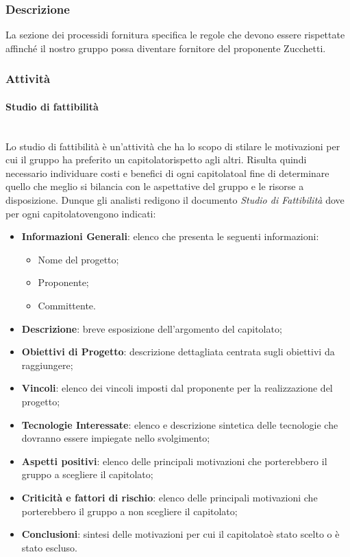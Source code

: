 \subsubsection{Descrizione}
La sezione dei processi\glosp di fornitura specifica le regole che devono essere rispettate affinché il nostro gruppo possa diventare fornitore del proponente Zucchetti.
\subsubsection{Attività}
\paragraph{Studio di fattibilità}\mbox{}\\ [1mm]
Lo studio di fattibilità è un'attività che ha lo scopo di stilare le motivazioni per cui il gruppo ha preferito un capitolato\glosp rispetto agli altri.
Risulta quindi necessario individuare costi e benefici di ogni capitolato\glosp al fine di determinare quello che meglio si bilancia con le aspettative del gruppo e le risorse a disposizione.
Dunque gli analisti redigono il documento \textit{Studio di Fattibilità} dove per ogni capitolato\glosp vengono indicati:
\begin{itemize}
	\item \textbf{Informazioni Generali}: elenco che presenta le seguenti informazioni: 
	\begin{itemize}
		\item Nome del progetto\glo;
		\item Proponente;
		\item Committente.
	\end{itemize} 
	\item \textbf{Descrizione}: breve esposizione dell'argomento del capitolato\glo;
	\item \textbf{Obiettivi di Progetto}: descrizione dettagliata centrata sugli obiettivi da raggiungere;
	\item \textbf{Vincoli}: elenco dei vincoli imposti dal proponente per la realizzazione del progetto\glo;
	\item \textbf{Tecnologie Interessate}: elenco e descrizione sintetica delle tecnologie che dovranno essere impiegate nello svolgimento;
	\item \textbf{Aspetti positivi}: elenco delle principali motivazioni che porterebbero il gruppo a scegliere il capitolato\glo;
	\item \textbf{Criticità e fattori di rischio}: elenco delle principali motivazioni che porterebbero il gruppo a non scegliere il capitolato\glo;
	\item \textbf{Conclusioni}: sintesi delle motivazioni per cui il capitolato\glosp è stato scelto o è stato escluso.
\end{itemize}
